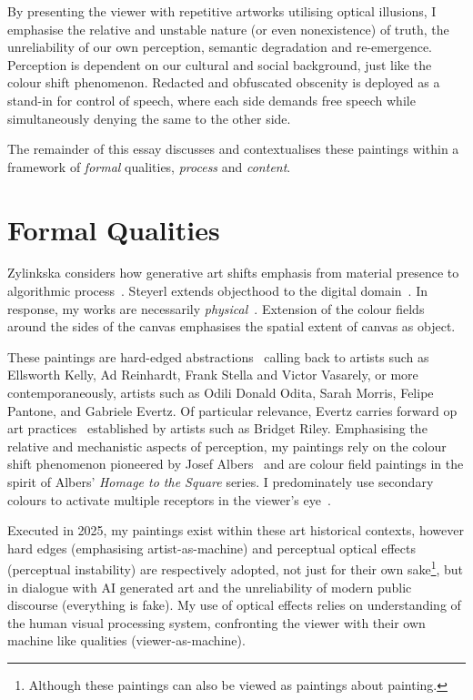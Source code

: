 \documentclass[12pt]{article}
\begin{document}
 By presenting the viewer with repetitive artworks utilising optical illusions, I emphasise the relative and unstable nature (or even nonexistence) of truth, the unreliability of our own perception, semantic degradation and re-emergence. Perception is dependent on our cultural and social background, just like the colour shift phenomenon.  Redacted and obfuscated obscenity is deployed as a stand-in for control of speech, where each side demands free speech while simultaneously denying the same to the other side.

The remainder of this essay discusses and contextualises these paintings within a framework of \emph{formal} qualities, \emph{process} and \emph{content}.

\section{Formal Qualities}
Zylinkska considers how generative art shifts emphasis from material presence to algorithmic process~\cite{zylinska2020ai}. Steyerl extends objecthood to the digital domain~\cite{steyerl2017duty}. In response, my works are necessarily \emph{physical}~\cite{fontana1947spatial,merleauponty1964eye}. Extension of the colour fields around the sides of the canvas emphasises the spatial extent of canvas as object. 

These paintings are hard-edged abstractions~\cite{Greenberg1961,Alloway1975,Judd1965,Fried1968} calling back to artists such as Ellsworth Kelly, Ad Reinhardt, Frank Stella and Victor Vasarely, or more contemporaneously, artists such as Odili Donald Odita, Sarah Morris, Felipe Pantone, and Gabriele Evertz. Of particular relevance, Evertz carries forward op art practices~\cite{Follin2004EmbodiedVisions,Riley2019EyesMind,Riley2019DialoguesOnArt,Seitz1965ResponsiveEye} established by artists such as Bridget Riley. Emphasising the relative and mechanistic aspects of perception, my paintings rely on the colour shift phenomenon pioneered by Josef Albers~\cite{albers} and are colour field paintings in the spirit of Albers' \emph{Homage to the Square} series. I predominately use secondary colours to  activate multiple receptors in the viewer's eye~\cite{HurvichJameson1957,Land1977,SchnapfKraftBaylor1987}.

Executed in 2025, my paintings exist within these art historical contexts, however hard edges (emphasising artist-as-machine) and perceptual optical effects (perceptual instability) are respectively adopted, not just for their own sake\footnote{Although these paintings can also be viewed as paintings about painting.}, but in dialogue with AI generated art and the unreliability of modern public discourse (everything is fake). My use of optical effects relies on understanding of the human visual processing system, confronting the viewer with their own machine like qualities (viewer-as-machine). 
\end{document}
